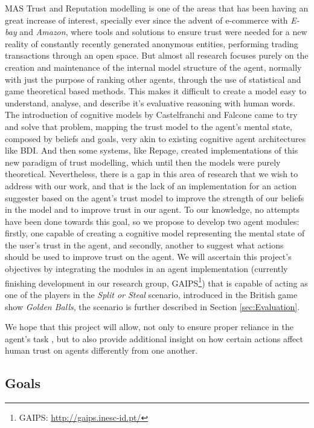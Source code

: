 \ac{MAS} Trust and Reputation modelling is one of the areas that has been having an great increase of interest, specially ever since the advent of e-commerce\cite{Granatyr2015} with \textit{E-bay} and \textit{Amazon}, where tools and solutions to ensure trust were needed for a new reality of constantly recently generated anonymous entities, performing trading transactions through an open space. But almost all research focuses purely on the creation and maintenance of the internal model structure of the agent, normally with just the purpose of ranking other agents, through the use of statistical and game theoretical based methods. This makes it difficult to create a model easy to understand, analyse, and describe it's evaluative reasoning with human words. The introduction of cognitive models by Castelfranchi and Falcone \cite{Castelfranchi1998} came to try and solve that problem, mapping the trust model to the agent's mental state, composed by beliefs and goals, very akin to existing cognitive agent architectures like BDI\cite{Rao1995}. And then some systems, like Repage\cite{Sabater2006}, created implementations of this new paradigm of trust modelling, which until then the models were purely theoretical. Nevertheless, there is a gap in this area of research that we wish to address with our work, and that is the lack of an implementation for an action suggester based on the agent's trust model to improve the strength of our beliefs in the model and to improve trust in our agent. To our knowledge, no attempts have been done towards this goal, so we propose to develop two agent modules: firstly, one capable of creating a cognitive model representing the mental state of the user's trust in the agent, and secondly, another to suggest what actions should be used to improve trust on the agent. We will ascertain this project's objectives by integrating the modules in an agent implementation (currently finishing development in our research group, \acs{GAIPS}\footnote{\ac{GAIPS}: \url{http://gaips.inesc-id.pt/}}) that is capable of acting as one of the players in the \textit{Split or Steal} scenario, introduced in the British game show \textit{Golden Balls}\cite{Wikipedia.Golden.Balls}, the scenario is further described in Section \ref{sec:Evaluation}.

We hope that this project will allow, not only to ensure proper reliance in the agent's task \cite{Lee2004}, but to also provide additional insight on how certain actions affect human trust on agents differently from one another.


\subsection{Goals}
\label{subsec:Goals}

